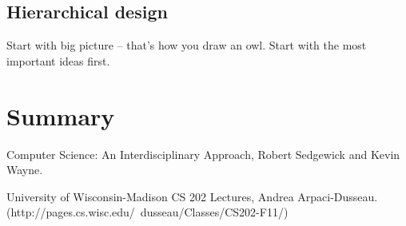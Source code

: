 \subsection{Hierarchical design}
Start with big picture -- that's how you draw an owl. Start with the most important ideas first. 

\section{Summary}



Computer Science: An Interdisciplinary Approach, Robert Sedgewick and Kevin Wayne.

University of Wisconsin-Madison CS 202 Lectures, Andrea Arpaci-Dusseau. (http://pages.cs.wisc.edu/~dusseau/Classes/CS202-F11/)
